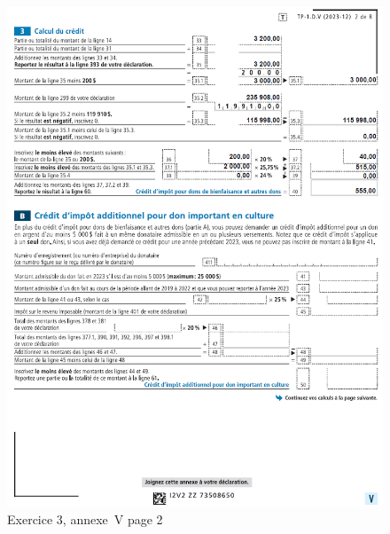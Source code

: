 \begin{figure}
	\centering
	\includegraphics[width=.9\textwidth]{exercice/7-3/Q6/AnnexeVp2.png}
	\caption[]{Exercice 3, annexe~V page 2}
	\label{fig:chap7Exercice3AnnexeVp2}
\end{figure}
